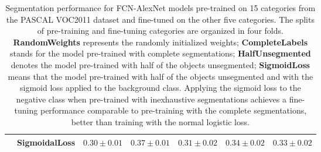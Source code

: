 \begin{table}[t]
{\begin{tabular}{l|c|cccc|c}
                                                                                  & SigmoidalLoss                                                                 & \multicolumn{1}{l}{$0.30\pm0.01$} & \multicolumn{1}{l}{$0.37\pm0.01$} & \multicolumn{1}{l}{$0.31\pm0.02$} & \multicolumn{1}{l|}{$0.34\pm0.02$} & $\mathbf{0.33\pm0.02}$                                                                          \\ \hline

\end{tabular}
}
\caption{
Segmentation performance for FCN-AlexNet models pre-trained on 15 categories from the PASCAL VOC2011 dataset and fine-tuned on the other five categories.
The splits of pre-training and fine-tuning categories are organized in four folds.
\textbf{RandomWeights} represents the randomly initialized weights;
\textbf{CompleteLabels} stands for the model pre-trained with complete segmentations;
\textbf{HalfUnsegmented} denotes the model pre-trained with half of the objects unsegmented;
\textbf{SigmoidLoss} means that the model pre-trained with half of the objects unsegmented and with the sigmoid loss applied to the background class.
Applying the sigmoid loss to the negative class when pre-trained with inexhaustive segmentations achieves a fine-tuning performance comparable to pre-training with the complete segmentations, better than training with the normal logistic loss.
}
\label{tab:unseg}
\end{table}



